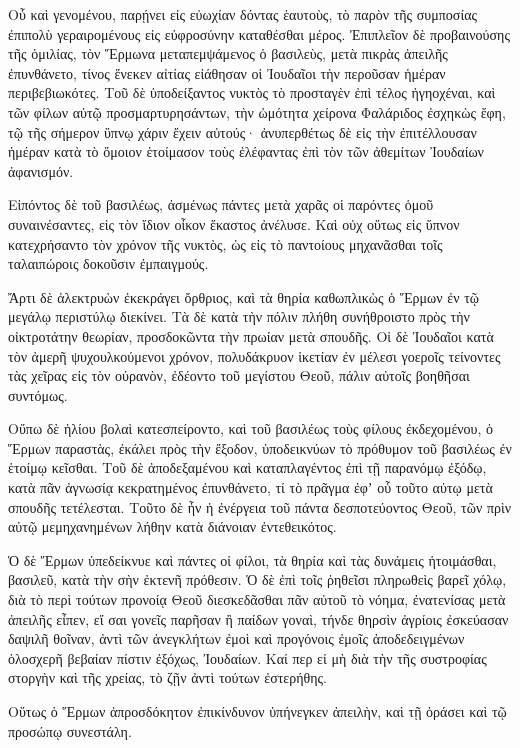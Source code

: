 {Οὗ καὶ γενομένου, παρῄνει εἰς εὐωχίαν δόντας ἑαυτοὺς, τὸ παρὸν τῆς συμποσίας ἐπιπολὺ γεραιρομένους εἰς εὐφροσύνην καταθέσθαι μέρος.
Ἐπιπλεῖον δὲ προβαινούσης τῆς ὁμιλίας, τὸν Ἕρμωνα μεταπεμψάμενος ὁ βασιλεὺς, μετὰ πικρὰς ἀπειλῆς ἐπυνθάνετο, τίνος ἕνεκεν αἰτίας εἰάθησαν οἱ Ἰουδαῖοι τὴν περοῦσαν ἡμέραν περιβεβιωκότες.
Τοῦ δὲ ὑποδείξαντος νυκτὸς τὸ προσταγὲν ἐπὶ τέλος ἠγηοχέναι, καὶ τῶν φίλων αὐτῷ προσμαρτυρησάντων,
τὴν ὠμότητα χείρονα Φαλάριδος ἐσχηκὼς ἔφη, τῷ τῆς σήμερον ὕπνῳ χάριν ἔχειν αὐτούς· ἀνυπερθέτως δὲ εἰς τὴν ἐπιτέλλουσαν ἡμέραν κατὰ τὸ ὅμοιον ἑτοίμασον τοὺς ἐλέφαντας ἐπὶ τὸν τῶν ἀθεμίτων Ἰουδαίων ἀφανισμόν.
\par }{\PP {}Εἰπόντος δὲ τοῦ βασιλέως, ἀσμένως πάντες μετὰ χαρᾶς οἱ παρόντες ὁμοῦ συναινέσαντες, εἰς τὸν ἴδιον οἶκον ἕκαστος ἀνέλυσε.
Καὶ οὐχ οὕτως εἰς ὕπνον κατεχρήσαντο τὸν χρόνον τῆς νυκτὸς, ὡς εἰς τὸ παντοίους μηχανᾶσθαι τοῖς ταλαιπώροις δοκοῦσιν ἐμπαιγμούς.
\par }{\PP {}Ἄρτι δὲ ἀλεκτρυὼν ἐκεκράγει ὄρθριος, καὶ τὰ θηρία καθωπλικὼς ὁ Ἕρμων ἐν τῷ μεγάλῳ περιστύλῳ διεκίνει.
Τὰ δὲ κατὰ τὴν πόλιν πλήθη συνήθροιστο πρὸς τὴν οἰκτροτάτην θεωρίαν, προσδοκῶντα τὴν πρωίαν μετὰ σπουδῆς.
Οἱ δὲ Ἰουδαῖοι κατὰ τὸν ἀμερῆ ψυχουλκούμενοι χρόνον, πολυδάκρυον ἱκετίαν ἐν μέλεσι γοεροῖς τείνοντες τὰς χεῖρας εἰς τὸν οὐρανὸν, ἐδέοντο τοῦ μεγίστου Θεοῦ, πάλιν αὐτοῖς βοηθῆσαι συντόμως.
\par }{\PP {}Οὔπω δὲ ἡλίου βολαὶ κατεσπείροντο, καὶ τοῦ βασιλέως τοὺς φίλους ἐκδεχομένου, ὁ Ἕρμων παραστὰς, ἐκάλει πρὸς τὴν ἔξοδον, ὑποδεικνύων τὸ πρόθυμον τοῦ βασιλέως ἐν ἑτοίμῳ κεῖσθαι.
Τοῦ δὲ ἀποδεξαμένου καὶ καταπλαγέντος ἐπὶ τῇ παρανόμῳ ἐξόδῳ, κατὰ πᾶν ἀγνωσίᾳ κεκρατημένος ἐπυνθάνετο, τί τὸ πρᾶγμα ἐφʼ οὗ τοῦτο αὐτῳ μετὰ σπουδῆς τετέλεσται.
Τοῦτο δὲ ἦν ἡ ἐνέργεια τοῦ πάντα δεσποτεύοντος Θεοῦ, τῶν πρὶν αὐτῷ μεμηχανημένων λήθην κατὰ διάνοιαν ἐντεθεικότος.
\par }{\PP {}Ὁ δὲ Ἕρμων ὑπεδείκνυε καὶ πάντες οἱ φίλοι, τὰ θηρία καὶ τὰς δυνάμεις ἡτοιμάσθαι, βασιλεῦ, κατὰ τὴν σὴν ἐκτενῆ πρόθεσιν.
Ὁ δὲ ἐπὶ τοῖς ῥηθεῖσι πληρωθεὶς βαρεῖ χόλῳ, διὰ τὸ περὶ τούτων προνοίᾳ Θεοῦ διεσκεδᾶσθαι πᾶν αὐτοῦ τὸ νόημα, ἐνατενίσας μετὰ ἀπειλῆς εἶπεν,
εἴ σαι γονεῖς παρῆσαν ἢ παίδων γοναὶ, τήνδε θηρσὶν ἀγρίοις ἐσκεύασαν δαψιλῆ θοῖναν, ἀντὶ τῶν ἀνεγκλήτων ἐμοὶ καὶ προγόνοις ἐμοῖς ἀποδεδειγμένων ὁλοσχερῆ βεβαίαν πίστιν ἐξόχως, Ἰουδαίων.
Καί περ εἰ μὴ διὰ τὴν τῆς συστροφίας στοργὴν καὶ τῆς χρείας, τὸ ζῇν ἀντὶ τούτων ἐστερήθης.
\par }{\PP {}Οὕτως ὁ Ἕρμων ἀπροσδόκητον ἐπικίνδυνον ὑπήνεγκεν ἀπειλὴν, καὶ τῇ ὁράσει καὶ τῷ προσώπῳ συνεστάλη.
}
